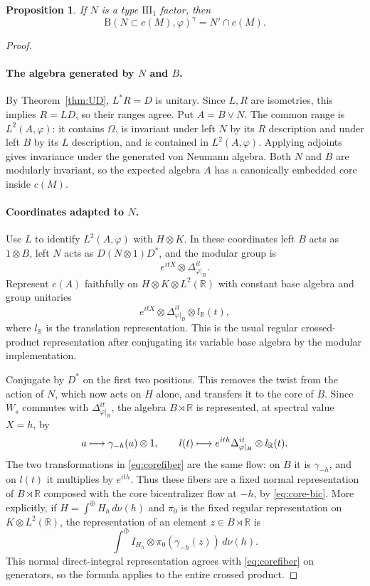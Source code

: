 \documentclass[11pt]{article}
\let\originallongmapsto\longmapsto
\renewcommand{\longmapsto}{\mathrel{\pdfliteral direct{/Span << /ActualText <FEFF27FC> >> BDC}\originallongmapsto\pdfliteral direct{EMC}}}
\newtheorem{proposition}[theorem]{Proposition}
\theoremstyle{definition}
\newcommand{\B}{\mathrm B}
\newcommand{\R}{\mathbb R}
\begin{document}
\begin{proposition}\label{prop:corefixed}
If $N$ is a type $\mathrm{III}_1$ factor, then
\[
 \B(N\subset c(M),\varphi)^\gamma=N'\cap c(M).
\]
\end{proposition}
\begin{proof}
\leavevmode
\paragraph{The algebra generated by $N$ and $B$.}
By Theorem~\ref{thm:UD}, $L^*R=D$ is unitary. Since $L,R$ are isometries,
this implies $R=LD$, so their ranges agree. Put $A=B\vee N$.
The common range is $L^2(A,\varphi)$: it contains $\Omega$, is invariant
under left $N$ by its $R$ description and under left $B$ by its $L$
description, and is contained in $L^2(A,\varphi)$. Applying adjoints gives
invariance under the generated von Neumann algebra. Both $N$ and $B$ are
modularly invariant, so the expected algebra $A$ has a canonically embedded
core inside $c(M)$.

\paragraph{Coordinates adapted to $N$.}
Use $L$ to identify $L^2(A,\varphi)$ with $H\otimes K$. In these coordinates
left $B$ acts as $1\otimes B$, left $N$ acts as $D(N\otimes1)D^*$, and the
modular group is
\[
 e^{itX}\otimes\Delta_{\varphi|_B}^{it}.
\]
Represent $c(A)$ faithfully on $H\otimes K\otimes L^2(\R)$ with constant
base algebra and group unitaries
\[
 e^{itX}\otimes\Delta_{\varphi|_B}^{it}\otimes l_{\R}(t),
\]
where $l_\R$ is the translation representation. This is the usual regular
crossed-product representation after conjugating its variable base algebra
by the modular implementation.

Conjugate by $D^*$ on the first two positions. This removes the twist
from the action of $N$, which now acts on $H$ alone, and transfers it to
the core of $B$. Since $W_s$ commutes with $\Delta_{\varphi|_B}^{it}$, the algebra
$B\rtimes\R$ is represented, at spectral value $X=h$, by
\begin{equation}\label{eq:corefiber}
 a\longmapsto\gamma_{-h}(a)\otimes1,\qquad
 l(t)\longmapsto e^{ith}\Delta_{\varphi|_B}^{it}\otimes l_\R(t).
\end{equation}
The two transformations in \eqref{eq:corefiber} are the same flow:
on $B$ it is $\gamma_{-h}$, and on $l(t)$ it multiplies by $e^{ith}$.
Thus these fibers are a fixed normal representation of $B\rtimes\R$
composed with the core bicentralizer flow at $-h$, by \eqref{eq:core-bic}.
More explicitly, if $H=\int^\oplus H_h\,d\nu(h)$ and $\pi_0$ is the fixed
regular representation on $K\otimes L^2(\R)$, the representation of an
element $z\in B\rtimes\R$ is
\[
 \int^\oplus I_{H_h}\otimes\pi_0(\gamma_{-h}(z))\,d\nu(h).
\]
This normal direct-integral representation agrees with \eqref{eq:corefiber}
on generators, so the formula applies to the entire crossed product.


\end{proof}
\end{document}
